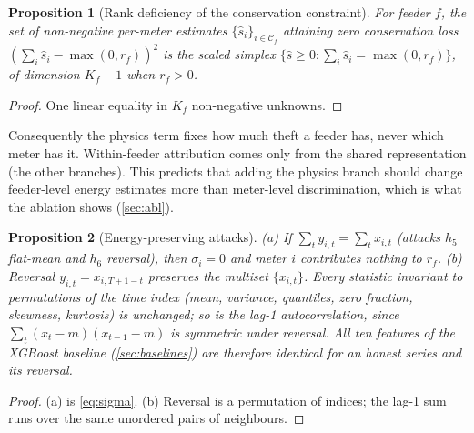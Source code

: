 \documentclass[11pt,a4paper]{article}
\theoremstyle{plain}
\newtheorem{proposition}{Proposition}
\theoremstyle{definition}
\theoremstyle{remark}
\begin{document}
\begin{proposition}[Rank deficiency of the conservation constraint]
\label{prop:rank}
For feeder $f$, the set of non-negative per-meter estimates $\{\hat s_i\}_{i\in\mathcal C_f}$ attaining zero conservation loss $(\sum_i\hat s_i-\max(0,r_f))^2$ is the scaled simplex $\{\hat s\ge0:\sum_i\hat s_i=\max(0,r_f)\}$, of dimension $K_f-1$ when $r_f>0$.
\end{proposition}
\begin{proof}
One linear equality in $K_f$ non-negative unknowns.
\end{proof}
Consequently the physics term fixes how much theft a feeder has, never which meter has it. Within-feeder attribution comes only from the shared representation (the other branches). This predicts that adding the physics branch should change feeder-level energy estimates more than meter-level discrimination, which is what the ablation shows (\cref{sec:abl}).

\begin{proposition}[Energy-preserving attacks]
\label{prop:h56}
(a) If $\sum_ty_{i,t}=\sum_tx_{i,t}$ (attacks $h_5$ flat-mean and $h_6$ reversal), then $\sigma_i=0$ and meter $i$ contributes nothing to $r_f$.
(b) Reversal $y_{i,t}=x_{i,T+1-t}$ preserves the multiset $\{x_{i,t}\}$. Every statistic invariant to permutations of the time index (mean, variance, quantiles, zero fraction, skewness, kurtosis) is unchanged; so is the lag-1 autocorrelation, since $\sum_t(x_t-m)(x_{t-1}-m)$ is symmetric under reversal. All ten features of the XGBoost baseline (\cref{sec:baselines}) are therefore identical for an honest series and its reversal.
\end{proposition}
\begin{proof}
(a) is \eqref{eq:sigma}. (b) Reversal is a permutation of indices; the lag-1 sum runs over the same unordered pairs of neighbours.
\end{proof}
\end{document}

